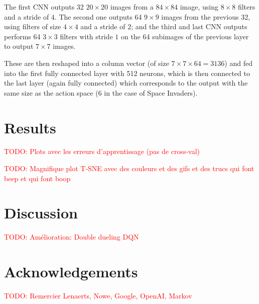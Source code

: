 \documentclass[letterpaper]{article}
\newcommand\todo[1]{\textcolor{red}{TODO: #1}}
\begin{document}
The first CNN outputs 32 $20 \times 20$ images from a $84 \times 84$ image, using $8 \times 8$ filters and a stride of $4$. The second one outputs
64 $9 \times 9$ images from the previous 32, using filters of size $4 \times 4$ and a stride of $2$; and the third and last CNN outputs performs
64 $3 \times 3$ filters with stride $1$ on the 64 subimages of the previous layer to output $7 \times 7$ images.

These are then reshaped into a column vector (of size $7 \times 7 \times 64 = 3136$) and fed into the first fully connected layer with 512 neurons,
which is then connected to the last layer (again fully connected) which corresponds to the output with the same size as the action space (6 in the
case of Space Invaders).

\section{Results}

  \todo{Plots avec les erreurs d'apprentissage (pas de cross-val)}

  \todo{Magnifique plot T-SNE avec des couleurs et des gifs et des trucs qui font beep et qui font boop}~\citep{wattenberg2016how}

\section{Discussion}

  \todo{Amélioration: Double dueling DQN}~\citep{DBLP:journals/corr/WangFL15}

\section{Acknowledgements}

  \todo{Remercier Lenaerts, Nowe, Google, OpenAI, Markov}

\footnotesize


\end{document}
